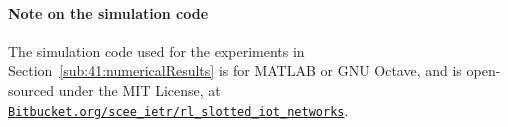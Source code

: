 \paragraph{Note on the simulation code}
%
The simulation code used for the experiments in Section~\ref{sub:41:numericalResults} is for MATLAB or GNU Octave,
and is open-sourced under the MIT License, at\\
\href{https://Bitbucket.org/scee_ietr/rl_slotted_iot_networks}{\texttt{Bitbucket.org/scee\_ietr/rl\_slotted\_iot\_networks}}.

% 
% 
